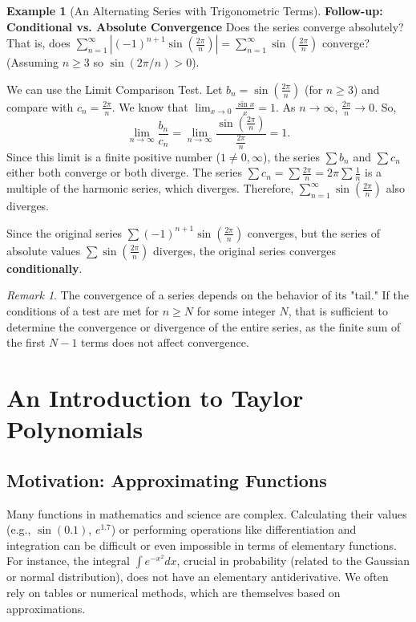 \documentclass[11pt, a4paper]{article}
\theoremstyle{plain}
\theoremstyle{definition}
\newtheorem{example}[theorem]{Example} %
\theoremstyle{remark}
\newtheorem{remark}[theorem]{Remark}
\begin{document}
\begin{example}[An Alternating Series with Trigonometric Terms]
\textbf{Follow-up: Conditional vs. Absolute Convergence}
Does the series converge absolutely? That is, does $\sum_{n=1}^{\infty} \left|(-1)^{n+1} \sin\left(\frac{2\pi}{n}\right)\right| = \sum_{n=1}^{\infty} \sin\left(\frac{2\pi}{n}\right)$ converge? (Assuming $n \ge 3$ so $\sin(2\pi/n)>0$).

We can use the Limit Comparison Test. Let $b_n = \sin\left(\frac{2\pi}{n}\right)$ (for $n \ge 3$) and compare with $c_n = \frac{2\pi}{n}$.
We know that $\lim_{x \to 0} \frac{\sin x}{x} = 1$.
As $n \to \infty$, $\frac{2\pi}{n} \to 0$. So,
\[ \lim_{n \to \infty} \frac{b_n}{c_n} = \lim_{n \to \infty} \frac{\sin\left(\frac{2\pi}{n}\right)}{\frac{2\pi}{n}} = 1. \]
Since this limit is a finite positive number ($1 \neq 0, \infty$), the series $\sum b_n$ and $\sum c_n$ either both converge or both diverge.
The series $\sum c_n = \sum \frac{2\pi}{n} = 2\pi \sum \frac{1}{n}$ is a multiple of the harmonic series, which diverges.
Therefore, $\sum_{n=1}^{\infty} \sin\left(\frac{2\pi}{n}\right)$ also diverges.

Since the original series $\sum (-1)^{n+1} \sin\left(\frac{2\pi}{n}\right)$ converges, but the series of absolute values $\sum \sin\left(\frac{2\pi}{n}\right)$ diverges, the original series converges \textbf{conditionally}.
\end{example}

\begin{remark}
The convergence of a series depends on the behavior of its "tail." If the conditions of a test are met for $n \ge N$ for some integer $N$, that is sufficient to determine the convergence or divergence of the entire series, as the finite sum of the first $N-1$ terms does not affect convergence.
\end{remark}

\section{An Introduction to Taylor Polynomials}

\subsection{Motivation: Approximating Functions}

Many functions in mathematics and science are complex. Calculating their values (e.g., $\sin(0.1)$, $e^{1.7}$) or performing operations like differentiation and integration can be difficult or even impossible in terms of elementary functions.
For instance, the integral $\int e^{-x^2} dx$, crucial in probability (related to the Gaussian or normal distribution), does not have an elementary antiderivative. We often rely on tables or numerical methods, which are themselves based on approximations.
\end{document}
